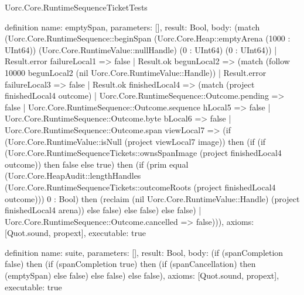 \begin{lexlean}{Uorc.Core.RuntimeSequenceTicketTests}
\begin{semanticmodule}
definition{
  name: emptySpan,
  parameters: [],
  result: Bool,
  body: (match (Uorc.Core.RuntimeSequence::beginSpan (Uorc.Core.Heap::emptyArena (1000 : UInt64)) (Uorc.Core.RuntimeValue::nullHandle) (0 : UInt64) (0 : UInt64))
    | Result.error failureLocal1 => false
    | Result.ok begunLocal2 => (match (follow 10000 begunLocal2 (nil Uorc.Core.RuntimeValue::Handle))
      | Result.error failureLocal3 => false
      | Result.ok finishedLocal4 => (match (project finishedLocal4 outcome)
        | Uorc.Core.RuntimeSequence::Outcome.pending => false
        | Uorc.Core.RuntimeSequence::Outcome.sequence hLocal5 => false
        | Uorc.Core.RuntimeSequence::Outcome.byte bLocal6 => false
        | Uorc.Core.RuntimeSequence::Outcome.span viewLocal7 => (if (Uorc.Core.RuntimeValue::isNull (project viewLocal7 image)) then (if (if (Uorc.Core.RuntimeSequenceTickets::ownsSpanImage (project finishedLocal4 outcome)) then false else true) then (if (prim equal (Uorc.Core.HeapAudit::lengthHandles (Uorc.Core.RuntimeSequenceTickets::outcomeRoots (project finishedLocal4 outcome))) 0 : Bool) then (reclaim (nil Uorc.Core.RuntimeValue::Handle) (project finishedLocal4 arena)) else false) else false) else false)
        | Uorc.Core.RuntimeSequence::Outcome.cancelled => false))),
  axioms: [Quot.sound, propext],
  executable: true
}

definition{
  name: suite,
  parameters: [],
  result: Bool,
  body: (if (spanCompletion false) then (if (spanCompletion true) then (if (spanCancellation) then (emptySpan) else false) else false) else false),
  axioms: [Quot.sound, propext],
  executable: true
}
\end{semanticmodule}
\end{lexlean}
